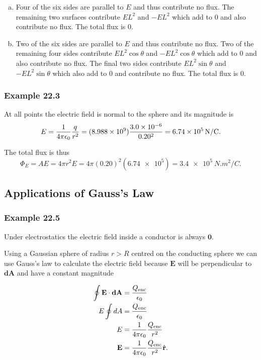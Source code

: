 \documentclass{article}
\begin{document}
\begin{enumerate}[a)]
  \item Four of the six sides are parallel to $E$ and thus contribute no flux. The remaining two surfaces contribute $E L^2$ and $-E L^2$ which add to $0$ and also contribute no flux. The total flux is $0$.

  \item Two of the six sides are parallel to $E$ and thus contribute no flux. Two of the remaining four sides contribute $E L^2 \cos \theta$ and $-E L^2 \cos \theta$ which add to $0$ and also contribute no flux. The final two sides contribute $E L^2 \sin \theta$ and $-E L^2 \sin \theta$ which also add to $0$ and contribute no flux. The total flux is $0$.
\end{enumerate}

\subsubsection{Example 22.3}

At all points the electric field is normal to the sphere and its magnitude is \[E = \frac{1}{4 \pi \epsilon_0} \frac{q}{r^2} = (\num{8.988e9}) \frac{\num{3.0e-6}}{0.20^2} = \qty{6.74e5}{N/C}.\]

The total flux is thus \[\Phi_E = AE = 4 \pi r^2 E = 4 \pi (0.20)^2 (\num{6.74e5}) = \qty{3.4e5}{N.m^2/C}.\]

\setcounter{subsection}{3}
\subsection{Applications of Gauss's Law}

\subsubsection{Example 22.5}

Under electrostatics the electric field inside a conductor is always $\mathbf{0}$.

Using a Gaussian sphere of radius $r > R$ centred on the conducting sphere we can use Gauss's law to calculate the electric field because $\mathbf{E}$ will be perpendicular to $\mathbf{dA}$ and have a constant magnitude

\begin{align*}
  \oint \mathbf{E} \cdot \mathbf{dA} & = \frac{Q_\textrm{enc}}{\epsilon_0}                \\
  E \oint dA                         & = \frac{Q_\textrm{enc}}{\epsilon_0}                \\
  E                                  & = \frac{1}{4 \pi \epsilon_0} \frac{Q_\textrm{enc}}{r^2}                   \\
  \mathbf{E}                         & = \frac{1}{4 \pi \epsilon_0} \frac{Q_\textrm{enc}}{r^2} \hat{\mathbf{r}}.
\end{align*}
\end{document}
